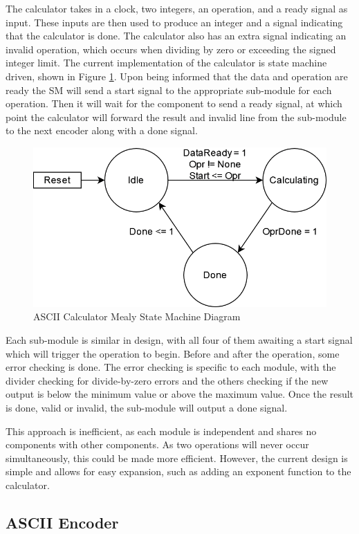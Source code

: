 \documentclass[11pt]{article}
\begin{document}
The calculator takes in a clock, two integers, an operation, and a ready signal as input.
These inputs are then used to produce an integer and a signal indicating that the calculator is done. 
The calculator also has an extra signal indicating an invalid operation, which occurs when dividing by zero or exceeding the signed integer limit.
The current implementation of the calculator is state machine driven, shown in Figure \ref{fig:calcsm}. 
Upon being informed that the data and operation are ready the SM will send a start signal to the appropriate sub-module for each operation.
Then it will wait for the component to send a ready signal, at which point the calculator will forward the result and invalid line from the sub-module to the next encoder along with a done signal.

\begin{figure}[H]        
    \centering
    \includegraphics[width=.5\textwidth]{CalculatorSM.drawio.png}
    \caption{ASCII Calculator Mealy State Machine Diagram}
    \label{fig:calcsm}
\end{figure} 

Each sub-module is similar in design, with all four of them awaiting a start signal which will trigger the operation to begin.
Before and after the operation, some error checking is done.
The error checking is specific to each module, with the divider checking for divide-by-zero errors and the others checking if the new output is below the minimum value or above the maximum value.
Once the result is done, valid or invalid, the sub-module will output a done signal.

This approach is inefficient, as each module is independent and shares no components with other components.
As two operations will never occur simultaneously, this could be made more efficient.
However, the current design is simple and allows for easy expansion, such as adding an exponent function to the calculator.

\subsection{ASCII Encoder}
\end{document}
